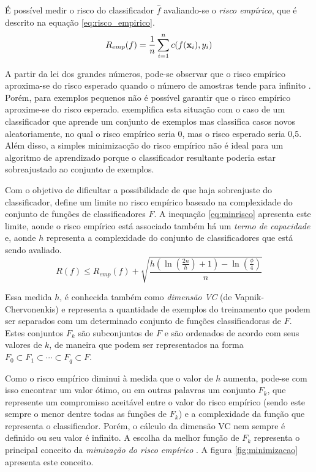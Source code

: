 É possível medir o risco do classificador $\hat{f}$ avaliando-se o \emph{risco empírico}, que é descrito na equação \ref{eq:risco_empirico}.
\begin{equation}\label{eq:risco_empirico}
  R_{emp}(f) = \frac{1}{n}\sum_{i=1}^n{c(f(\mathbf{x}_i),y_i)}
\end{equation}

A partir da lei dos grandes números, pode-se observar que o risco empírico aproxima-se do risco esperado quando o número de amostras tende para infinito . Porém, para exemplos pequenos não é possível garantir que o risco empírico aproxime-se do risco esperado.  exemplifica esta situa\c{c}ão com o caso de um classificador que aprende um conjunto de exemplos mas classifica casos novos aleatoriamente, no qual o risco empírico seria 0, mas o risco esperado seria 0,5. Além disso, a simples minimizac\c{c}ão do risco empírico não é ideal para um algoritmo de aprendizado porque o classificador resultante poderia estar sobreajustado ao conjunto de exemplos.

Com o objetivo de dificultar a possibilidade de que haja sobreajuste do classificador,  define um limite no risco empírico baseado na complexidade do conjunto de fun\c{c}ões de classificadores $F$. A inequa\c{c}ão \ref{eq:minrisco} apresenta este limite, aonde o risco empírico está associado também há um \emph{termo de capacidade} e, aonde $h$ representa a complexidade do conjunto de classificadores que está sendo avaliado.
\begin{equation}\label{eq:minrisco}
  R(f) \leqslant R_{emp}(f) + \sqrt{\frac{h(\ln(\frac{2n}{h})+1)-\ln(\frac{\phi}{4})}{n}}
\end{equation}

Essa medida $h$, é conhecida também como \emph{dimensão VC} (de Vapnik-Chervonenkis) e representa a quantidade de exemplos do treinamento que podem ser separados com um determinado conjunto de fun\c{c}ões classificadoras de $F$. Estes conjuntos $F_k$ são subconjuntos de $F$ e são ordenados de acordo com seus valores de $k$, de maneira que podem ser representados na forma $F_0\subset F_1 \subset \dotsb \subset F_q \subset F$.

Como o risco empírico diminui à medida que o valor de $h$ aumenta, pode-se com isso encontrar um valor ótimo, ou em outras palavras um conjunto $F_k$, que represente um compromisso aceitável entre o valor do risco empírico (sendo este sempre o menor dentre todas as fun\c{c}ões de $F_k$) e a complexidade da fun\c{c}ão que representa o classificador. Porém, o cálculo da dimensão VC nem sempre é definido ou seu valor é infinito. A escolha da melhor fun\c{c}ão de $F_k$ representa o principal conceito da \emph{mimiza\c{c}ão do risco empírico} . A figura \ref{fig:minimizacao} apresenta este conceito.

